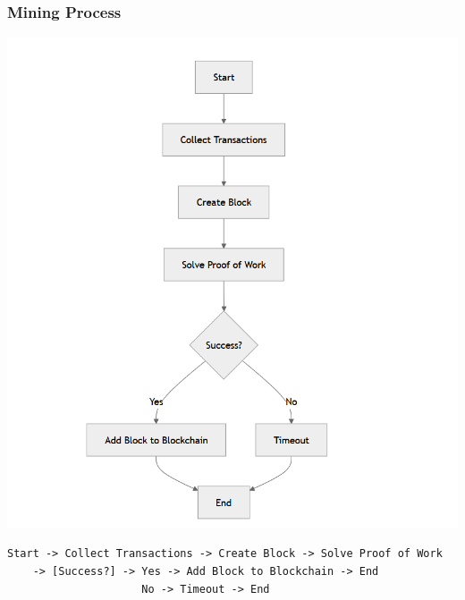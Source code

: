 \documentclass[12pt]{article}
\begin{document}
\subsubsection{Mining Process}
\includegraphics[]{images/5_4_1.PNG}
\begin{verbatim}
Start -> Collect Transactions -> Create Block -> Solve Proof of Work
    -> [Success?] -> Yes -> Add Block to Blockchain -> End
                     No -> Timeout -> End
\end{verbatim}
\end{document}

